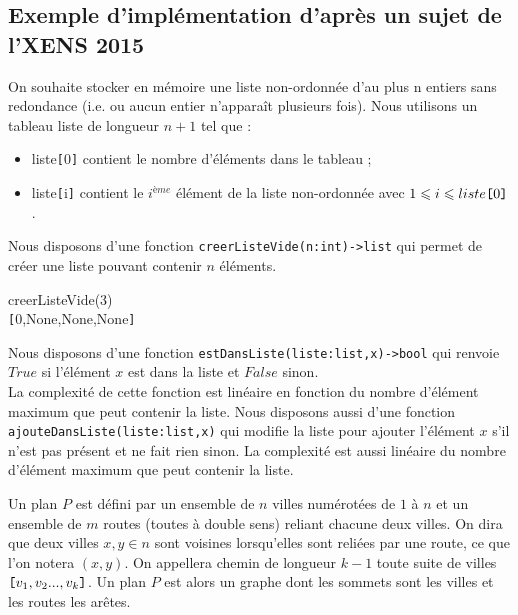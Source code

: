 \subsection{Exemple d'implémentation d'après un sujet de l'XENS 2015}
On souhaite stocker en mémoire une liste non-ordonnée d'au plus n entiers sans redondance (i.e. ou aucun entier n'apparaît
plusieurs fois). Nous utilisons un tableau 
liste de longueur $n+1$ tel que :
\begin{itemize}
\item liste\verb![!0\verb!]! contient le nombre d'éléments dans le tableau ;
\item liste\verb![!i\verb!]! contient le $i^{ème}$ élément de la liste non-ordonnée avec $1\leqslant i \leqslant liste\verb![!0\verb!]!$.
\end{itemize}
Nous disposons d'une fonction \texttt{creerListeVide(n:int)->list} qui permet de créer une liste pouvant contenir $n$ éléments.

\begin{pythonshell}
\invite creerListeVide(3)\\
\verb![!0,None,None,None\verb!]!
\end{pythonshell}

Nous disposons d'une fonction \texttt{estDansListe(liste:list,x)->bool} qui renvoie $True$ si l'élément $x$ est dans la liste et $False$ sinon.\\
La complexité de cette fonction est linéaire en fonction du nombre d'élément maximum que peut contenir la liste. 
Nous disposons aussi d'une fonction \texttt{ajouteDansListe(liste:list,x)} qui modifie la liste pour ajouter l'élément $x$ s'il n'est pas présent et ne fait rien sinon. La complexité est aussi linéaire du nombre d'élément maximum que peut contenir la liste.

\medskip
Un plan $P$ est défini par un ensemble de $n$ villes numérotées de $1$ à $n$ et un ensemble de $m$ routes (toutes à double sens)
reliant chacune deux villes. On dira que deux villes $x, y \in  n$ sont voisines lorsqu'elles sont reliées par une route, ce que l'on notera $(x, y)$. On appellera chemin de longueur $k-1$ toute suite de villes $\verb![!v_1, v_2 ... , v_k\verb!]!$. Un plan $P$ est alors un graphe dont les sommets sont les villes et les routes les arêtes.

